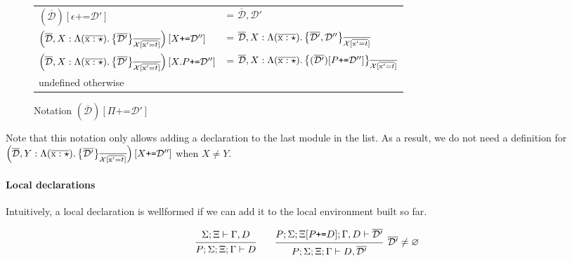\documentclass[12pt]{article}
\newcommand{\tx}{\text{\rm x}}
\newcommand{\emptyenv}{\varnothing}
\newcommand{\Gammatop}{\ensuremath{\Xi}}
\newcommand{\Gammabot}{\ensuremath{\Gamma}}
\begin{document}
\begin{figure}[H]
    \begin{center}
        \begin{tabular}{ll}$
            \left(\overline{\mathcal{D}}\right)\left[\epsilon \texttt{+=} \mathcal{D}'\right]$                               & = $\overline{\mathcal{D}}, \mathcal{D}'$                                                              \\
            $\left(\overline{\mathcal{D}}, X : \Moddecl[\tx][\overline{\mathcal{D}'}]\right)[X \texttt{+=} \mathcal{D}'']$   & = $\overline{\mathcal{D}}, X : \Moddecl[\tx][\overline{\mathcal{D}'}, \mathcal{D}'']$                 \\
            $\left(\overline{\mathcal{D}}, X : \Moddecl[\tx][\overline{\mathcal{D}'}]\right)[X.P \texttt{+=} \mathcal{D}'']$ & = $\overline{\mathcal{D}}, X : \Moddecl[\tx][(\overline{\mathcal{D}'})[P \texttt{+=} \mathcal{D}'']]$ \\
            undefined otherwise
        \end{tabular}
    \end{center}
    \caption{Notation $(\overline{\mathcal{D}})[\Pi \texttt{+=} \mathcal{D}']$}
\end{figure}

Note that this notation only allows adding a declaration to
the last module in the list. As a result, we do not need a
definition for $\left(\overline{\mathcal{D}}, Y : \Moddecl[\tx][\overline{\mathcal{D}'}]\right)[X \texttt{+=} \mathcal{D}'']$
when $X \neq Y$.

\paragraph{Local declarations}

Intuitively, a local declaration is wellformed if we can add it to the
local environment built so far.

\[
    \begin{prooftree}
        \hypo { \Sigma; \Gammatop \vdash \Gammabot, D }
        \infer1 { P; \Sigma; \Gammatop; \Gammabot \vdash D }
    \end{prooftree}
    \qquad
    \begin{prooftree}
        \hypo { P; \Sigma; \Gammatop[P \texttt{+=} D]; \Gammabot, D \vdash \overline{\mathcal{D}'} }
        \infer1[$\overline{\mathcal{D}'} \neq \emptyenv$] { P; \Sigma; \Gammatop; \Gammabot \vdash D, \overline{\mathcal{D}'} }
    \end{prooftree}
\]
\end{document}
